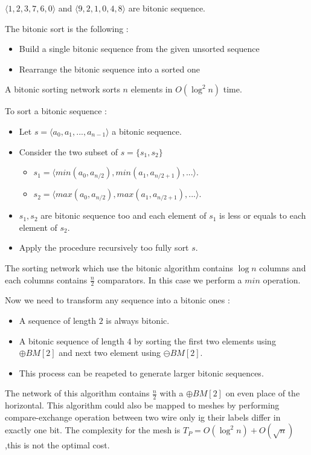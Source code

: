\documentclass[11pt,a4paper]{report}
\begin{document}
$\langle 1,2,3,7,6,0 \rangle$ and $\langle 9,2,1,0,4,8 \rangle$ are bitonic sequence.

The bitonic sort is the following :
\begin{itemize}
    \item Build a single bitonic sequence from the given unsorted sequence
    \item Rearrange the bitonic sequence into a sorted one
\end{itemize}

A bitonic sorting network sorts $n$ elements in $O(\log^2n)$ time.

To sort a bitonic sequence :
\begin{itemize}
    \item Let $s = \langle a_0,a_1,...,a_{n-1} \rangle$ a bitonic sequence.
    \item Consider the two subset of $s = \{s_1,s_2\}$
        \begin{itemize}
            \item $s_1 = \langle min(a_0,a_{n/2}),min(a_1,a_{n/2 + 1}),... \rangle$.
            \item $s_2 = \langle max(a_0,a_{n/2}),max(a_1,a_{n/2 + 1}),... \rangle$.
        \end{itemize}
    \item $s_1,s_2$ are bitonic sequence too and each element of $s_1$ is less or equals to each element of $s_2$.
    \item Apply the procedure recursively too fully sort $s$.
\end{itemize}

The sorting network which use the bitonic algorithm contains $\log n$ columns and each columns contains $\frac{n}{2}$ comparators. In this case we perform a $min$ operation.

Now we need to transform any sequence into a bitonic ones :
\begin{itemize}
    \item A sequence of length $2$ is always bitonic.
    \item A bitonic sequence of length $4$ by sorting the first two elements using $\oplus BM[2]$ and next two element using $\ominus BM[2]$.
    \item This process can be reapeted to generate larger bitonic sequences.
\end{itemize}

The network of this algorithm contains $\frac{n}{2}$ with a $\oplus BM[2]$ on even place of the horizontal. This algorithm could also be mapped to meshes by performing compare-exchange operation between two wire only ig their labels differ in exactly one bit. The complexity for the mesh is $T_P = O(\log^2n) + O(\sqrt{n})$,this is not the optimal cost.
\end{document}
